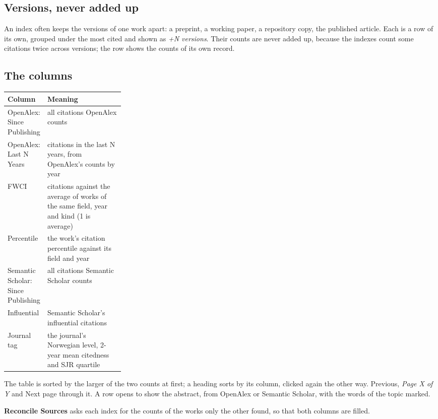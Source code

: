 \subsection{Versions, never added up}
An index often keeps the versions of one work apart: a preprint, a working paper, a repository copy, the published
article. Each is a row of its own, grouped under the most cited and shown as \emph{+N versions}. Their counts are never
added up, because the indexes count some citations twice across versions; the row shows the counts of its own record.

\subsection{The columns}
\begin{center}\small
\renewcommand{\arraystretch}{1.2}
\begin{tabularx}{\linewidth}{@{}p{0.27\linewidth}L@{}}
\toprule
\textbf{Column} & \textbf{Meaning}\\
\midrule
OpenAlex: Since Publishing & all citations OpenAlex counts\\
OpenAlex: Last N Years & citations in the last N years, from OpenAlex's counts by year\\
FWCI & citations against the average of works of the same field, year and kind (1 is average)\\
Percentile & the work's citation percentile against its field and year\\
Semantic Scholar: Since Publishing & all citations Semantic Scholar counts\\
Influential & Semantic Scholar's influential citations\\
Journal tag & the journal's Norwegian level, 2-year mean citedness and SJR quartile\\
\bottomrule
\end{tabularx}
\end{center}

The table is sorted by the larger of the two counts at first; a heading sorts by its column, clicked again the other way.
Previous, \emph{Page X of Y} and Next page through it. A row opens to show the abstract, from OpenAlex or Semantic Scholar,
with the words of the topic marked.

\textbf{Reconcile Sources} asks each index for the counts of the works only the other found, so that both columns are
filled.

